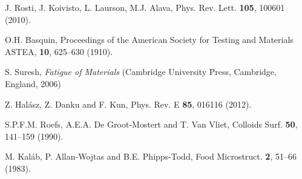 \documentclass[twocolumn,superscriptaddress,showpacs,preprintnumbers,amsmath,amssymb,prl]{revtex4}
\begin{document}
\begin{thebibliography}{}
 J. Rosti, J. Koivisto, L. Laurson, M.J. Alava, Phys. Rev. Lett. {\bf 105}, 100601 (2010).

 O.H. Basquin, Proceedings of the American Society for Testing and Materials ASTEA, {\bf 10}, 625--630 (1910).

 S. Suresh, {\it Fatigue of Materials} (Cambridge University Press, Cambridge, England, 2006)

 Z. Hal\'asz, Z. Danku and F. Kun, Phys. Rev. E {\bf 85}, 016116 (2012).

 S.P.F.M. Roefs, A.E.A. De Groot-Mostert and T. Van Vliet, Colloids Surf. {\bf 50}, 141--159 (1990).

 M. Kal\'ab, P. Allan-Wojtas and B.E. Phipps-Todd, Food Microstruct. {\bf 2}, 51--66 (1983).
















\end{thebibliography}
\end{document}
